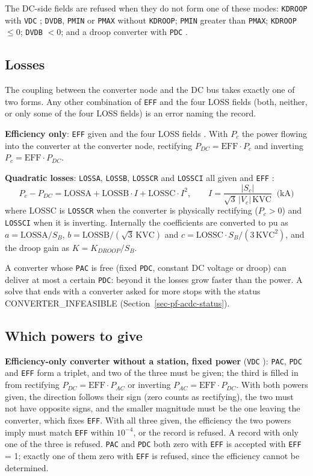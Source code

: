The DC-side fields are refused when they do not form one of these modes: {\tt KDROOP} with {\tt VDC} {\tt *}; {\tt DVDB}, {\tt PMIN} or {\tt PMAX} without {\tt KDROOP}; {\tt PMIN} greater than {\tt PMAX}; {\tt KDROOP} $\le 0$; {\tt DVDB} $< 0$; and a droop converter with {\tt PDC} {\tt *}.

\subsection{Losses}

The coupling between the converter node and the DC bus takes exactly one of two forms. Any other combination of {\tt EFF} and the four LOSS fields (both, neither, or only some of the four LOSS fields) is an error naming the record.

{\bf Efficiency only}: {\tt EFF} given and the four LOSS fields {\tt *}. With $P_c$ the power flowing into the converter at the converter node, rectifying $P_{DC} = \mbox{EFF}\cdot P_c$ and inverting $P_c = \mbox{EFF}\cdot P_{DC}$.

{\bf Quadratic losses}: {\tt LOSSA}, {\tt LOSSB}, {\tt LOSSCR} and {\tt LOSSCI} all given and {\tt EFF} {\tt *}:
\begin{equation}
P_c - P_{DC} = \mbox{LOSSA} + \mbox{LOSSB}\cdot I + \mbox{LOSSC}\cdot I^2, \qquad I = \frac{|S_c|}{\sqrt{3}\,|V_c|\,\mbox{KVC}} \;\; \mbox{(kA)}
\end{equation}
where LOSSC is {\tt LOSSCR} when the converter is physically rectifying ($P_c > 0$) and {\tt LOSSCI} when it is inverting. Internally the coefficients are converted to pu as $a = \mbox{LOSSA}/S_B$, $b = \mbox{LOSSB}/(\sqrt{3}\,\mbox{KVC})$ and $c = \mbox{LOSSC}\cdot S_B/(3\,\mbox{KVC}^2)$, and the droop gain as $K = K_{DROOP}/S_B$.

A converter whose {\tt PAC} is free (fixed {\tt PDC}, constant DC voltage or droop) can deliver at most a certain {\tt PDC}: beyond it the losses grow faster than the power. A solve that ends with a converter asked for more stops with the status CONVERTER\_INFEASIBLE (Section~\ref{sec-pf-acdc-status}).

\subsection{Which powers to give}

{\bf Efficiency-only converter without a station, fixed power} ({\tt VDC} {\tt *}): {\tt PAC}, {\tt PDC} and {\tt EFF} form a triplet, and two of the three must be given; the third is filled in from rectifying $P_{DC} = \mbox{EFF}\cdot P_{AC}$ or inverting $P_{AC} = \mbox{EFF}\cdot P_{DC}$. With both powers given, the direction follows their sign (zero counts as rectifying), the two must not have opposite signs, and the smaller magnitude must be the one leaving the converter, which fixes {\tt EFF}. With all three given, the efficiency the two powers imply must match {\tt EFF} within $10^{-4}$, or the record is refused. A record with only one of the three is refused. {\tt PAC} and {\tt PDC} both zero with {\tt EFF} {\tt *} is accepted with {\tt EFF} = 1; exactly one of them zero with {\tt EFF} {\tt *} is refused, since the efficiency cannot be determined.

